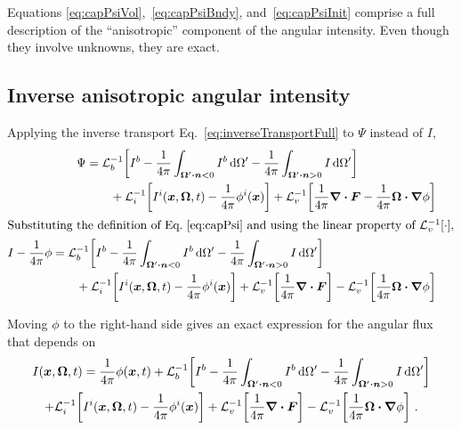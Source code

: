 Equations \eqref{eq:capPsiVol},~\eqref{eq:capPsiBndy}, and~\eqref{eq:capPsiInit}
comprise a full description of the ``anisotropic'' component of the angular
intensity. Even though they involve unknowns, they are exact.

\subsection{Inverse anisotropic angular intensity}

Applying the inverse transport Eq.~\eqref{eq:inverseTransportFull} to $\Psi$
instead of $I$,
\begin{align*}\nonumber
 \begin{split}
 \Psi &=
 \lopinv{b}{
  I^b
- \frac{1}{4\pi} \int_{\vec{\Omega}' \vd \vec{n} < 0} I^b \ud \Omega'
- \frac{1}{4\pi} \int_{\vec{\Omega}' \vd \vec{n} > 0} I \ud \Omega' }
\\&\qquad
+ \lopinv{i}{
  I^i(\vec{x}, \vec{\Omega}, t)
- \frac{1}{4\pi} \phi^i(\vec{x}) }
+ \lopinv{v}{
  \frac{1}{4\pi} \grad \vd\vec{F}
- \frac{1}{4\pi} \vec{\Omega}\vd \grad \phi} 
 \end{split}
 \\ 
 \intertext{Substituting the definition of Eq.~\eqref{eq:capPsi} and using the
 linear property of $\lopinv{v}{\cdot}$,}
 \begin{split}
 I - \frac{1}{4\pi} \phi &=
 \lopinv{b}{
  I^b
- \frac{1}{4\pi} \int_{\vec{\Omega}' \vd \vec{n} < 0} I^b \ud \Omega'
- \frac{1}{4\pi} \int_{\vec{\Omega}' \vd \vec{n} > 0} I \ud \Omega' }
\\&\qquad
+ \lopinv{i}{
  I^i(\vec{x}, \vec{\Omega}, t)
- \frac{1}{4\pi} \phi^i(\vec{x}) }
+ \lopinv{v}{ \frac{1}{4\pi} \grad \vd\vec{F} }
- \lopinv{v}{ \frac{1}{4\pi} \vec{\Omega}\vd \grad \phi } 
 \end{split}
\end{align*}

Moving $\phi$ to the right-hand side gives an exact expression for the angular
flux that depends on 
\begin{multline}\label{eq:inverseAnisotropicExact}
  I(\bm{x}, \bm{\Omega}, t)  =
 \frac{1}{4\pi} \phi(\bm{x}, t)
+ \mathcal{L}_{b}^{-1}\!\left[
  I^b
- \frac{1}{4\pi} \int_{\bm{\Omega}' \bm{\cdot} \bm{n} < 0} I^b \mathop{}\!\mathrm{d} \Omega'
- \frac{1}{4\pi} \int_{\bm{\Omega}' \bm{\cdot} \bm{n} > 0} I \mathop{}\!\mathrm{d} \Omega' \right]
\\
+ \mathcal{L}_{i}^{-1}\!\left[
  I^i(\bm{x}, \bm{\Omega}, t)
- \frac{1}{4\pi} \phi^i(\bm{x}) \right]
+ \mathcal{L}_{v}^{-1}\!\left[ \frac{1}{4\pi} \bm{\nabla} \bm{\cdot}\bm{F} \right]
- \mathcal{L}_{v}^{-1}\!\left[ \frac{1}{4\pi} \bm{\Omega}\bm{\cdot} \bm{\nabla} \phi \right] \,.
\end{multline}

